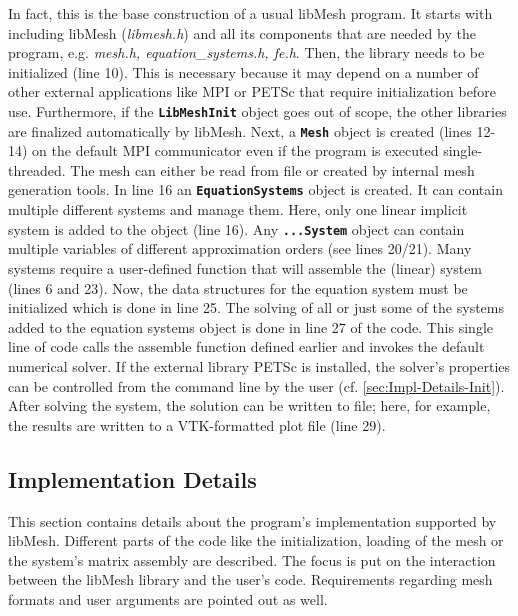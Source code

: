  In fact, this is the base construction of a usual libMesh program. It starts with including libMesh (\textit{libmesh.h}) and all its components that are needed by the program, e.g. \textit{mesh.h, equation\_systems.h, fe.h}. Then, the library needs to be initialized (line 10). This is necessary because it may depend on a number of other external applications like MPI or PETSc that require initialization before use. Furthermore, if the \texttt{\textbf{LibMeshInit}} object goes out of scope, the other libraries are finalized automatically by libMesh. Next, a \texttt{\textbf{Mesh}} object is created (lines 12-14) on the default MPI communicator even if the program is executed single-threaded. The mesh can either be read from file or created by internal mesh generation tools. In line 16 an \texttt{\textbf{EquationSystems}} object is created. It can contain multiple different systems and manage them. Here, only one linear implicit system is added to the object (line 16). Any \texttt{\textbf{...System}} object can contain multiple variables of different approximation orders (see lines 20/21). Many systems require a user-defined function that will assemble the (linear) system (lines 6 and 23). Now, the data structures for the equation system must be initialized which is done in line 25. The solving of all or just some of the systems added to the equation systems object is done in line 27 of the code. This single line of code calls the assemble function defined earlier and invokes the default numerical solver. If the external library PETSc is installed, the solver's properties can be controlled from the command line by the user (cf. \ref{sec:Impl-Details-Init}). After solving the system, the solution can be written to file; here, for example, the results are written to a VTK-formatted plot file (line 29).
 
 \subsection{Implementation Details}\label{sec:Impl-Details}
  This section contains details about the program's implementation supported by libMesh. Different parts of the code like the initialization, loading of the mesh or the system's matrix assembly are described. The focus is put on the interaction between the libMesh library and the user's code. Requirements regarding mesh formats and user arguments are pointed out as well.

 
